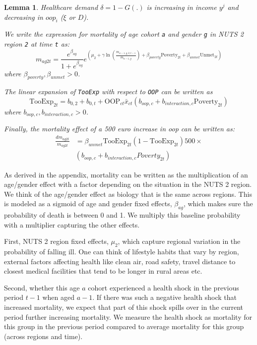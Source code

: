 \documentclass[a4paper,12pt]{article}
\newtheorem{lemma}{Lemma}
\begin{document}
\begin{lemma}
Healthcare demand \(\delta = 1-G(.)\) is increasing in income \(y^j\) and decreasing in \(oop_i\) (\(\xi\) or \(D\)).

We write the expression for mortality of age cohort \texttt{a} and gender \texttt{g}  in NUTS 2 region \texttt{2} at time \texttt{t} as:
$$
m_{ag2t} = \frac{e^{\beta_{ag}}}{1+e^{\beta_{ag}}} e^{\left( \mu_2 + \gamma \ln \left(\frac{m_{a-1,g,2,t-1}}{\bar{m}_{a-1,g}}\right)+ \beta_{poverty}\text{Poverty}_{2t} + \beta_{unmet}\text{Unmet}_{2t}\right)}
$$
where \(\beta_{poverty}, \beta_{unmet} > 0\).

The linear expansion of \texttt{TooExp} with respect to \texttt{OOP} can be written as
$$
\text{TooExp}_{2t} = b_{0,2} + b_{0,t} + \text{OOP}_{ct} \bar{x}_{ct} \left(  b_{oop,c} + b_{interaction,c} \text{Poverty}_{2t} \right)
$$
where \(b_{oop,c},b_{interaction,c}>0\).

Finally, the mortality effect of a 500 euro increase in oop can be written as:
\begin{eqnarray*}
\frac{dm_{ag2t}}{m_{ag2t}} &= \beta_{unmet} \text{TooExp}_{2t}(1-\text{TooExp}_{2t}) 500 \times \\
                          & (b_{oop,c}+b_{interaction,c} Poverty_{2t})
\end{eqnarray*}
\caption{\label{prop:1}}
\end{lemma}

As derived in the appendix, mortality can be written as the multiplication of an age/gender effect with a factor depending on the situation in the NUTS 2 region.
We think of the age/gender effect as biology that is the same across regions. This is modeled as a sigmoid of age and gender fixed effects, \(\beta_{ag}\), which makes sure the probability of death is between 0 and 1. We multiply this baseline probability with a multiplier capturing the other effects.

First, NUTS 2 region fixed effects, \(\mu_2\), which capture regional variation in the probability of falling ill. One can think of lifestyle habits that vary by region, external factors affecting health like clean air, road safety, travel distance to closest medical facilities that tend to be longer in rural areas etc.

Second, whether this age \(a\) cohort experienced a health shock in the previous period \(t-1\) when aged \(a-1\). If there was such a negative health shock that increased mortality, we expect that part of this shock spills over in the current period further increasing mortality. We measure the health shock as mortality for this group in the previous period compared to average mortality for this group (across regions and time).
\end{document}
